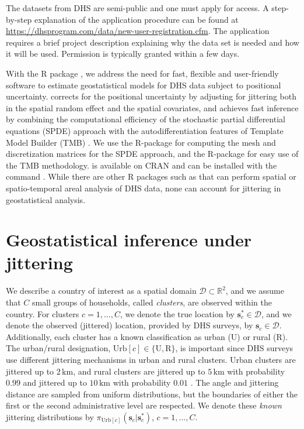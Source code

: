 The datasets from DHS are semi-public and one must apply for access. A step-by-step explanation of the application procedure can be found at \url{https://dhsprogram.com/data/new-user-registration.cfm}. The application requires a brief project description  explaining why the data set is needed and how it will be used. Permission is typically granted within a few days.

With the R package , we address the need for fast, flexible and user-friendly software to estimate geostatistical models for DHS data subject to positional uncertainty.  corrects for the positional uncertainty by adjusting for jittering both in the spatial random effect and the spatial covariates, and achieves fast inference by combining the computational efficiency of the stochastic partial differential equations (SPDE) approach \citep{Lindgren:etal:11} with the autodifferentiation features of Template Model Builder (TMB) \citep{tmb}. We use the R-package  \citep{fmesherPackage} for computing the mesh and discretization matrices for the SPDE approach, and the R-package  for easy use of the TMB methodology.  is available on CRAN \citep{Rmain} and can be installed with the command . While there are other R packages such as  \citep{li2020space,summerPackage} that can perform spatial or spatio-temporal areal analysis of DHS data, none can account for jittering in geostatistical analysis.



\section{Geostatistical inference under jittering}
\label{sec:method}
We describe a country of interest as a spatial domain $\mathcal{D}\subset\mathbb{R}^2$, and we assume that $C$ small groups of households, called \emph{clusters}, are observed within the country. For clusters $c = 1, \ldots, C$, we denote the true location by $\boldsymbol{s}_c^* \in\mathcal{D}$, and we denote the observed (jittered) location, provided by DHS surveys, by $\boldsymbol{s}_c \in\mathcal{D}$. Additionally, each cluster has a known classification as urban (U) or rural (R). The urban/rural designation, $\mathrm{Urb}[c]\in\{\mathrm{U},\mathrm{R}\}$, is important since DHS surveys use different jittering mechanisms in urban and rural clusters.
Urban clusters are jittered up to $2\, \mathrm{km}$, and rural clusters are jittered up to $5\, \mathrm{km}$ with probability $0.99$ and jittered up to $10\, \mathrm{km}$ with probability $0.01$ \citep{DHSspatial07}. The angle and jittering distance are sampled from uniform distributions, but the boundaries of either the first or the second administrative level are respected. We denote these \emph{known} jittering distributions by $\pi_{\mathrm{Urb}[c]}(\boldsymbol{s}_c|\boldsymbol{s}_c^*)$, $c = 1, \ldots, C$.


